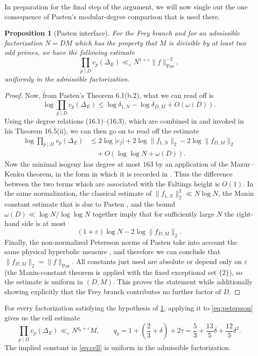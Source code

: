 \documentclass[11pt,reqno]{amsart}
\newtheorem{proposition}[theorem]{Proposition}
\theoremstyle{definition}
\newcommand{\eps}{\varepsilon}
\begin{document}
In preparation for the final step of the argument, we will now single out the
one consequence of Pasten's modular-degree comparison that is used there.

\begin{proposition}[Pasten interface]\label{prop:pasten-interface}
For the Frey branch and for an admissible factorization $N=DM$ which has the
property that $M$ is divisible by at least two odd primes, we have the
following estimate
\[
 \prod_{p\mid D}v_p(\Delta_E)
 \ll_\eps N^{1+\eps}\|f\|_{\mathrm{Pas}}^{-2},
\]
uniformly in the admissible factorization.
\end{proposition}

\begin{proof}
Now, from Pasten's Theorem 6.1(b.2), what we can read off is
\[
 \log\prod_{p\mid D}v_p(\Delta_E)
 \leq\log\delta_{1,N}-\log\delta_{D,M}+O(\omega(D)).
\]
Using the degree relations (16.1)--(16.3), which are combined in
\cite[Theorem 16.1, pp.~305--307]{Pasten} and invoked in his Theorem
16.5(ii), we can then go on to read off the estimate
\begin{align*}
 \log\prod_{p\mid D}v_p(\Delta_E)
 &\leq2\log|c_f|+2\log\|f_{1,N}\|_2-2\log\|f_{D,M}\|_2\\
 &\quad+O(\log\log N+\omega(D)).
\end{align*}
Now the minimal isogeny has degree at most $163$ by an
application of the Mazur--Kenku theorem, in the form in which it is recorded
in \cite[proof of Theorem 16.1]{Pasten}.  Thus the difference between the two terms which are
associated with the Faltings height is $O(1)$.  In the same normalization, the classical estimate of
$\|f_{1,N}\|_2^2\ll N\log N$, the Manin constant estimate that is due to
Pasten \cite[Theorem 1.1 and proof of Theorem 16.1]{Pasten}, and the bound
$\omega(D)\ll\log N/\log\log N$ together imply that for sufficiently large
$N$ the right-hand side is at most
\[
 (1+\eps)\log N-2\log\|f_{D,M}\|_2.
\]
Finally, the non-normalized Petersson norms of Pasten take
into account the same physical hyperbolic measure \cite[Section
4.6]{Pasten}, and therefore we can conclude that
$\|f_{D,M}\|_2=\|f\|_{\mathrm{Pas}}$. All constants just used are absolute
or depend only on $\eps$ (the Manin-constant theorem is applied with the
fixed exceptional set $\{2\}$), so the estimate is uniform in $(D,M)$.
This proves the statement while additionally showing explicitly that the
Frey branch contributes no further factor of $D$.
\end{proof}

For every factorization satisfying the hypothesis of
\cref{prop:pasten-interface}, applying it to \eqref{eq:petersson} gives us the
cell estimate
\begin{equation}\label{eq:cell}
 \prod_{p\mid D}v_p(\Delta_E)
 \ll_\eps N^{q_\delta+\eps}M,\qquad
q_\delta=1+\left(\frac23+\delta\right)+2\tau
 =\frac53+\frac{13}{5}\delta+\frac{12}{5}\delta^2.
\end{equation}
The implied constant in \eqref{eq:cell} is uniform in the admissible
factorization.
\end{document}
